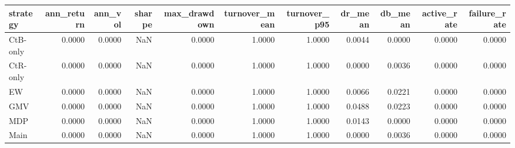 \begin{tabular}{lrrrrrrrrrr}
\toprule
strategy & ann_return & ann_vol & sharpe & max_drawdown & turnover_mean & turnover_p95 & dr_mean & db_mean & active_rate & failure_rate \\
\midrule
CtB-only & 0.0000 & 0.0000 & NaN & 0.0000 & 1.0000 & 1.0000 & 0.0044 & 0.0000 & 0.0000 & 0.0000 \\
CtR-only & 0.0000 & 0.0000 & NaN & 0.0000 & 1.0000 & 1.0000 & 0.0000 & 0.0036 & 0.0000 & 0.0000 \\
EW & 0.0000 & 0.0000 & NaN & 0.0000 & 1.0000 & 1.0000 & 0.0066 & 0.0221 & 0.0000 & 0.0000 \\
GMV & 0.0000 & 0.0000 & NaN & 0.0000 & 1.0000 & 1.0000 & 0.0488 & 0.0223 & 0.0000 & 0.0000 \\
MDP & 0.0000 & 0.0000 & NaN & 0.0000 & 1.0000 & 1.0000 & 0.0143 & 0.0000 & 0.0000 & 0.0000 \\
Main & 0.0000 & 0.0000 & NaN & 0.0000 & 1.0000 & 1.0000 & 0.0000 & 0.0036 & 0.0000 & 0.0000 \\
\bottomrule
\end{tabular}
